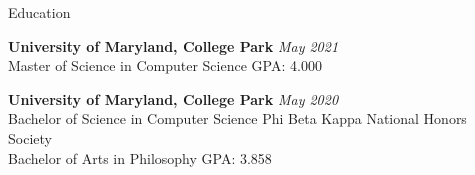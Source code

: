 \documentclass{resume} %
\begin{document}

\begin{rSection}{Education}

{\bf University of Maryland, College Park} \hfill {\em May 2021} \\ 
Master of Science in  Computer Science \hfill {GPA: 4.000}

{\bf University of Maryland, College Park} \hfill {\em May 2020} \\ 
Bachelor of Science in  Computer Science \hfill {Phi Beta Kappa National Honors Society}\\
Bachelor of Arts in Philosophy \hfill {GPA: 3.858}

\end{rSection}

\end{document}
